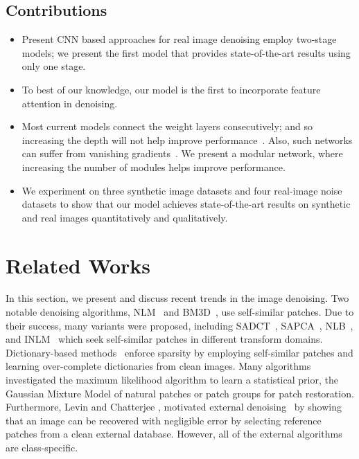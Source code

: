 \documentclass[10pt,twocolumn,letterpaper]{article}
\begin{document}
\subsection{Contributions}
\begin{itemize}
\item Present CNN based approaches for real image denoising employ two-stage models; we present the first model that provides state-of-the-art results using only one stage. 

\item  To best of our knowledge, our model is the first to incorporate feature attention in denoising.



\item Most current models connect the weight layers consecutively; and so increasing the depth will not help improve performance~\cite{dong2016SRCNN,lim2017EDSR}.
Also, such networks can suffer from vanishing gradients~\cite{bengio1994vanishing}.  We present a modular network, where increasing the number of modules helps improve performance.

\item We experiment on three synthetic image datasets and four real-image noise datasets to show that our model achieves state-of-the-art results on synthetic and real images quantitatively and qualitatively.
\end{itemize}

\section{Related Works}
In this section, we present and discuss recent trends in the image denoising.  Two notable denoising algorithms, NLM~\cite{Buades2005NLM} and BM3D~\cite{Dabov2007BM3D}, use self-similar patches.  Due to their success, many variants were proposed, including SADCT~\cite{Foi2007SADCT},  SAPCA~\cite{Dabov2009BM3DSAPCA}, NLB~\cite{Lebrun2013NLB}, and INLM~\cite{Goossens2008INLM} which seek self-similar patches in different transform domains. Dictionary-based methods~\cite{Elad2009ERD,Mairal2009NLSM,Dong2011CSR} enforce sparsity by employing self-similar patches and learning over-complete dictionaries from clean images. Many algorithms \cite{Zoran2011EPLL, Chen2015External, Xu2015PG-GMM} investigated the maximum likelihood algorithm to learn a statistical prior, \eg the Gaussian Mixture Model of natural patches or patch groups for patch restoration.  Furthermore, Levin \etal \cite{Levin2011Bounds} and  Chatterjee \etal \cite{Chatterjee2010IDD},  motivated external denoising~\cite{anwar2017category,anwar2017combined,luo2015adaptive,Yue2015CID} by showing 
that an image can be recovered with negligible error by selecting reference patches from a clean external database. However, all of the external algorithms are class-specific.
\end{document}
